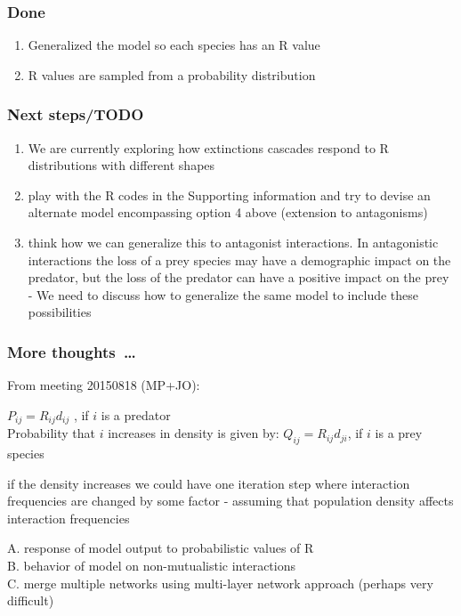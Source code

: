 \documentclass[12pt]{article}
\begin{document}
\subsubsection*{Done}

\begin{enumerate}

	\item Generalized the model so each species has an R value 

	\item R values are sampled from a probability distribution

\end{enumerate}

\subsubsection*{Next steps/TODO}

\begin{enumerate}
	
	\item We are currently exploring how extinctions cascades respond to R distributions with different shapes
	
	\item play with the R codes in the Supporting information and try to devise an alternate model encompassing option 4 above (extension to antagonisms)
	
	\item think how we can generalize this to antagonist interactions. In antagonistic interactions the loss of a prey species may have a demographic impact on the predator, but the loss of the predator can have a positive impact on the prey - We need to discuss how to generalize the same model to include these possibilities
	
\end{enumerate}

\subsubsection*{More thoughts~\ldots}

From meeting 20150818 (MP+JO):

$P_{ij} = R_{ij} d_{ij}$ , if $i$ is a predator\\

Probability that $i$ increases in density is given by:
$Q_{ij} = R_{ij} d_{ji}$, if $i$ is a prey species 

if the density increases we could have one iteration step where interaction frequencies are changed by some factor - assuming that population density affects interaction frequencies



A. response of model output to probabilistic values of R\\
B. behavior of model on non-mutualistic interactions\\
C. merge multiple networks using multi-layer network approach (perhaps very difficult)
\end{document}

